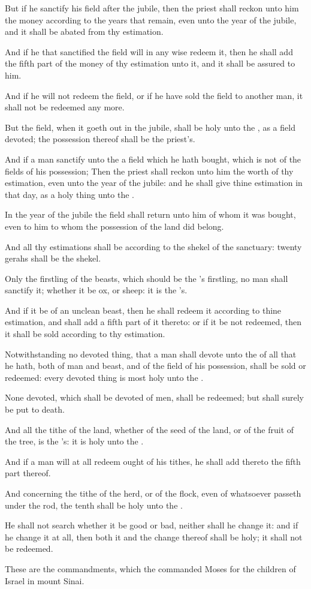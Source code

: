\verse But if he sanctify his field after the jubile, then the priest shall reckon unto him the money according to the years that remain, even unto the year of the jubile, and it shall be abated from thy estimation.

\verse And if he that sanctified the field will in any wise redeem it, then he shall add the fifth part of the money of thy estimation unto it, and it shall be assured to him.

\verse And if he will not redeem the field, or if he have sold the field to another man, it shall not be redeemed any more.

\verse But the field, when it goeth out in the jubile, shall be holy unto the \LORD, as a field devoted; the possession thereof shall be the priest's.

\verse And if a man sanctify unto the \LORD a field which he hath bought, which is not of the fields of his possession; \verse Then the priest shall reckon unto him the worth of thy estimation, even unto the year of the jubile: and he shall give thine estimation in that day, as a holy thing unto the \LORD.

\verse In the year of the jubile the field shall return unto him of whom it was bought, even to him to whom the possession of the land did belong.

\verse And all thy estimations shall be according to the shekel of the sanctuary: twenty gerahs shall be the shekel.

\verse Only the firstling of the beasts, which should be the \LORD's firstling, no man shall sanctify it; whether it be ox, or sheep: it is the \LORD's.

\verse And if it be of an unclean beast, then he shall redeem it according to thine estimation, and shall add a fifth part of it thereto: or if it be not redeemed, then it shall be sold according to thy estimation.

\verse Notwithstanding no devoted thing, that a man shall devote unto the \LORD of all that he hath, both of man and beast, and of the field of his possession, shall be sold or redeemed: every devoted thing is most holy unto the \LORD.

\verse None devoted, which shall be devoted of men, shall be redeemed; but shall surely be put to death.

\verse And all the tithe of the land, whether of the seed of the land, or of the fruit of the tree, is the \LORD's: it is holy unto the \LORD.

\verse And if a man will at all redeem ought of his tithes, he shall add thereto the fifth part thereof.

\verse And concerning the tithe of the herd, or of the flock, even of whatsoever passeth under the rod, the tenth shall be holy unto the \LORD.

\verse He shall not search whether it be good or bad, neither shall he change it: and if he change it at all, then both it and the change thereof shall be holy; it shall not be redeemed.

\verse These are the commandments, which the \LORD commanded Moses for the children of Israel in mount Sinai.

